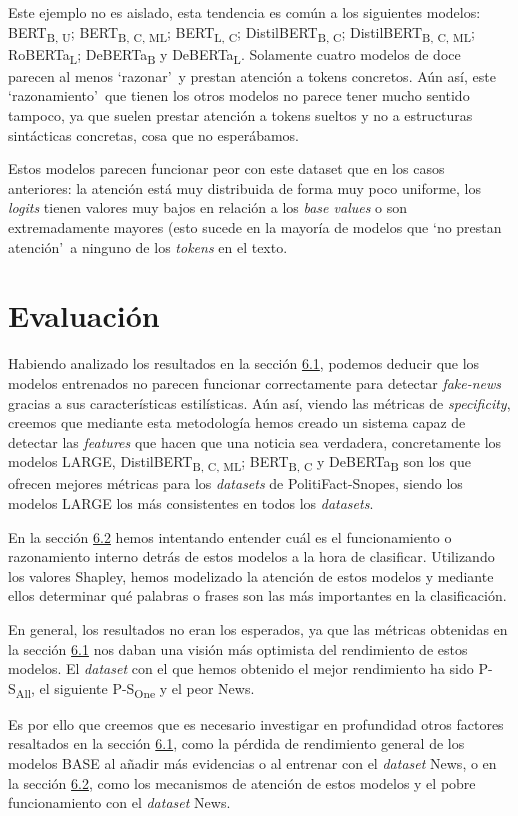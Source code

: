 Este ejemplo no es aislado, esta tendencia es común a los siguientes modelos: {BERT}\textsubscript{B, U}; {BERT}\textsubscript{B, C, ML}; {BERT}\textsubscript{L, C}; {DistilBERT}\textsubscript{B, C}; {DistilBERT}\textsubscript{B, C, ML}; {RoBERTa}\textsubscript{L}; {DeBERTa}\textsubscript{B} y {DeBERTa}\textsubscript{L}. Solamente cuatro modelos de doce parecen al menos `razonar'\ y prestan atención a tokens concretos. Aún así, este `razonamiento'\ que tienen los otros modelos no parece tener mucho sentido tampoco, ya que suelen prestar atención a tokens sueltos y no a estructuras sintácticas concretas, cosa que no esperábamos.

Estos modelos parecen funcionar peor con este dataset que en los casos anteriores: la atención está muy distribuida de forma muy poco uniforme, los \textit{logits} tienen valores muy bajos en relación a los \textit{base values} o son extremadamente mayores (esto sucede en la mayoría de modelos que `no prestan atención'\ a ninguno de los \textit{tokens} en el texto.

\section{Evaluación}
\label{sec:eval}

Habiendo analizado los resultados en la sección \hyperref[sec:results]{6.1}, podemos deducir que los modelos entrenados no parecen funcionar correctamente para detectar \textit{fake-news} gracias a sus características estilísticas. Aún así, viendo las métricas de \textit{specificity}, creemos que mediante esta metodología hemos creado un sistema capaz de detectar las \textit{features} que hacen que una noticia sea verdadera, concretamente los modelos LARGE, {DistilBERT}\textsubscript{B, C, ML}; {BERT}\textsubscript{B, C} y {DeBERTa}\textsubscript{B} son los que ofrecen mejores métricas para los \textit{datasets} de PolitiFact-Snopes, siendo los modelos LARGE los más consistentes en todos los \textit{datasets}.

En la sección \hyperref[sec:shap]{6.2} hemos intentando entender cuál es el funcionamiento o razonamiento interno detrás de estos modelos a la hora de clasificar. Utilizando los valores Shapley, hemos modelizado la atención de estos modelos y mediante ellos determinar qué palabras o frases son las más importantes en la clasificación.

En general, los resultados no eran los esperados, ya que las métricas obtenidas en la sección \hyperref[sec:results]{6.1} nos daban una visión más optimista del rendimiento de estos modelos. El \textit{dataset} con el que hemos obtenido el mejor rendimiento ha sido {P-S}\textsubscript{All}, el siguiente {P-S}\textsubscript{One} y el peor News.

Es por ello que creemos que es necesario investigar en profundidad otros factores resaltados en la sección \hyperref[sec:results]{6.1}, como la pérdida de rendimiento general de los modelos BASE al añadir más evidencias o al entrenar con el \textit{dataset} News, o en la sección \hyperref[sec:shap]{6.2}, como los mecanismos de atención de estos modelos y el pobre funcionamiento con el \textit{dataset} News.